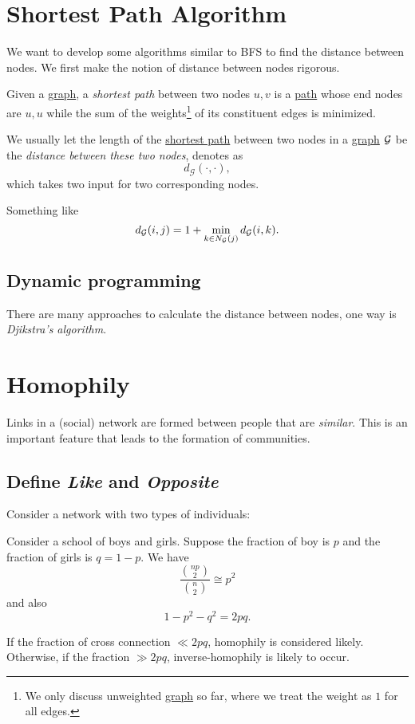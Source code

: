 \section{Shortest Path Algorithm}
We want to develop some algorithms similar to BFS to find the distance between nodes. We first make the notion of distance between nodes rigorous.

\begin{definition}\label{def:shortest-path}
	Given a \hyperref[def:graph]{graph}, a \emph{shortest path} between two nodes \(u, v\) is a \hyperref[def:path]{path} whose end nodes are
	\(u, u\) while the sum of the weights\footnote{We only discuss unweighted \hyperref[def:graph]{graph} so far, where we treat the weight as \(1\) for all edges.}
	of its constituent edges is minimized.
\end{definition}

\begin{definition}\label{def:distance-between-nodes}
	We usually let the length of the \hyperref[def:shortest-path]{shortest path} between two nodes in a \hyperref[def:graph]{graph} \(\mathcal{\MakeUppercase{g}}\)
	be the \emph{distance between these two nodes}, denotes as
	\[
		d_{\mathcal{G}}(\cdot, \cdot),
	\]
	which takes two input for two corresponding nodes.
\end{definition}

Something like
\[
	d_{\mathcal{\MakeUppercase{g}} } (i, j) = 1 + \min_{k\in N_{\mathcal{\MakeUppercase{g}} } (j)} d_{\mathcal{\MakeUppercase{g}} } (i, k).
\]

\subsection{Dynamic programming}
There are many approaches to calculate the distance between nodes, one way is \emph{Djikstra's algorithm}.

\section{Homophily}
Links in a (social) network are formed between people that are \emph{similar}. This is an important feature that leads to
the formation of communities.

\subsection{Define \emph{Like} and \emph{Opposite}}
Consider a network with two types of individuals:
\begin{eg}
	Consider a school of boys and girls. Suppose the fraction of boy is $p$ and the fraction of girls is $q = 1 - p$. We have
	\[
		\frac{\binom{np}{2}}{\binom{n}{2}} \cong p^2
	\]
	and also
	\[
		1 - p^2 - q^2 = 2pq.
	\]

	If the fraction of cross connection $\ll 2pq$, homophily is considered likely. Otherwise, if the fraction $\gg 2pq$, inverse-homophily is likely to occur.
\end{eg}

